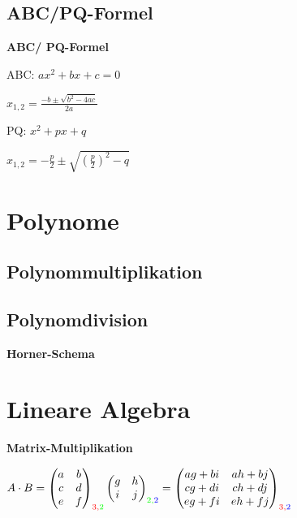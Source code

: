 \subsection{ABC/PQ-Formel}

\textbf{ABC/ PQ-Formel}

ABC: $ax^2 + bx + c = 0$

$\displaystyle{
    x_{1,2} = \frac{-b \pm \sqrt{ b^2 - 4ac }}{2a}
}$

PQ: $x^2 + px + q$

$\displaystyle{
    x_{1,2} = -\frac{p}{2} \pm \sqrt{\left(\frac{p}{2}\right)^2 - q}
}$

\section{Polynome}

\subsection{Polynommultiplikation}

\subsection{Polynomdivision}

\textbf{Horner-Schema}

\section{Lineare Algebra}

\textbf{Matrix-Multiplikation}

$\displaystyle{
    A \cdot B = 
    \begin{pmatrix}
        a & b\\
        c & d\\
        e & f
    \end{pmatrix}_{\color{red} 3 , \color{green} 2 }
    \begin{pmatrix}
        g & h\\
        i & j
    \end{pmatrix}_{\color{green} 2, \color{blue} 2}
    = 
    \begin{pmatrix}
        a g + b i & a h + b j\\
        c g + d i & c h + d j\\
        e g + f i & e h + f j
    \end{pmatrix}_{\color{red} 3, \color{blue} 2}
}$

